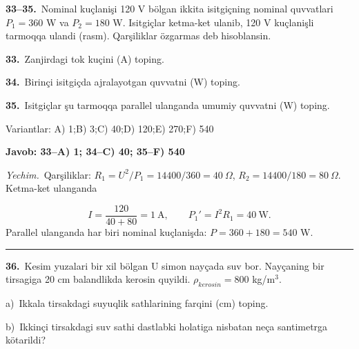 \documentclass[11pt,a4paper]{article}
\begin{document}
\newpage\noindent\textbf{33–35.}\ Nominal kuçlanişi 120 V bölgan ikkita isitgiçning nominal quvvatlari $P_1=360$ W va $P_2=180$ W. Isitgiçlar ketma-ket ulanib, 120 V kuçlanişli tarmoqqa ulandi (rasm). Qarşiliklar özgarmas deb hisoblansin.\par\medskip
\begin{center}\end{center}
\noindent\textbf{33.}\ Zanjirdagi tok kuçini (A) toping.\par
\noindent\textbf{34.}\ Birinçi isitgiçda ajralayotgan quvvatni (W) toping.\par
\noindent\textbf{35.}\ Isitgiçlar şu tarmoqqa parallel ulanganda umumiy quvvatni (W) toping.\par
\noindent Variantlar: A) 1;\quad B) 3;\quad C) 40;\quad D) 120;\quad E) 270;\quad F) 540\par\smallskip
\noindent\colorbox{gray!12}{\parbox{\dimexpr\linewidth-2\fboxsep}{\textbf{Javob: 33--A) 1; 34--C) 40; 35--F) 540}}}\par\smallskip
\noindent\textit{Yechim.}\ Qarşiliklar: $R_1=U^2/P_1=14400/360=40\ \Omega$, $R_2=14400/180=80\ \Omega$. Ketma-ket ulanganda\par
\[I=\frac{120}{40+80}=1\ \text{A},\qquad P_1'=I^2R_1=40\ \text{W}.\]
Parallel ulanganda har biri nominal kuçlanişda: $P=360+180=540$ W.\par\par\medskip\hrule\medskip
{}\noindent\textbf{36.}\ Kesim yuzalari bir xil bölgan U simon nayçada suv bor. Nayçaning bir tirsagiga 20 cm balandlikda kerosin quyildi. $\rho_{kerosin}=800$ kg/m$^3$.\par
\noindent\hspace*{4mm}a)\ Ikkala tirsakdagi suyuqlik sathlarining farqini (cm) toping.\par
\noindent\hspace*{4mm}b)\ Ikkinçi tirsakdagi suv sathi dastlabki holatiga nisbatan neça santimetrga kötarildi?\par
\end{document}
